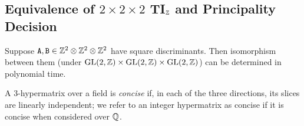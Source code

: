 \subsection{Equivalence of $2 \times 2 \times 2$ TI$_{\mathbb{Z}}$ and Principality Decision}

\begin{lemma} \label{lem:tensorZ}
Suppose $\mathtt{A}, \mathtt{B} \in \mathbb{Z}^2 \otimes \mathbb{Z}^2 \otimes \mathbb{Z}^2$ have square discriminants. Then isomorphism between them (under $\mathrm{GL}(2,\mathbb{Z}) \times \mathrm{GL}(2,\mathbb{Z}) \times \mathrm{GL}(2,\mathbb{Z})$) can be determined in polynomial time.
\end{lemma}

A 3-hypermatrix over a field is \emph{concise} if, in each of the three directions, its slices are linearly independent; we refer to an integer hypermatrix as concise if it is concise when considered over $\mathbb{Q}$.


